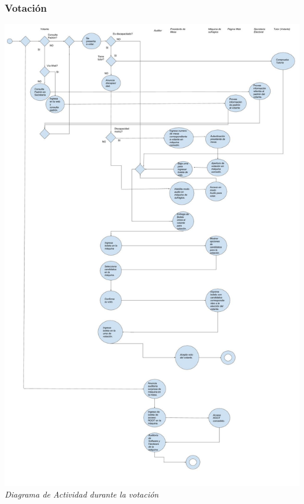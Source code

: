 \documentclass[spanish, 10pt,a4paper]{article}
\numberwithin{equation}{section} %
\begin{document}
\subsubsection{Votación}
\vspace{\baselineskip}
    \begin{center}
                \includegraphics[scale=0.32]{imagenes/actividad/LlegadadeVotante-auditor.jpg}
                \\
                \vspace{1pt}
                \footnotesize\textit{Diagrama de Actividad durante la votación}
        \end{center}
\vspace{\baselineskip}
\end{document}
